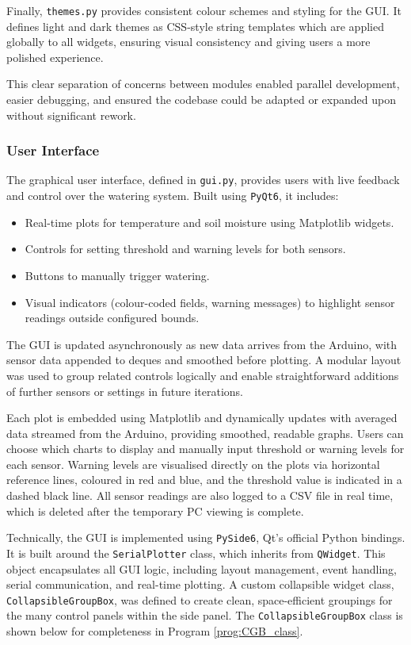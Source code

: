\documentclass[a4paper,11pt]{article}
\begin{document}
Finally, \texttt{themes.py} provides consistent colour schemes and styling for the GUI. 
It defines light and dark themes as CSS-style string templates 
which are applied globally to all widgets, 
ensuring visual consistency and giving users a more polished experience.

This clear separation of concerns between modules enabled parallel development, 
easier debugging, and ensured the codebase could be adapted 
or expanded upon without significant rework.

\subsubsection{User Interface}
\label{subsec:software_ui}

The graphical user interface, defined in \texttt{gui.py}, 
provides users with live feedback and control over the watering system. 
Built using \texttt{PyQt6}, it includes:

\begin{itemize}[nosep]
    \item Real-time plots for temperature and soil moisture using Matplotlib widgets.
    \item Controls for setting threshold and warning levels for both sensors.
    \item Buttons to manually trigger watering.
    \item Visual indicators (colour-coded fields, warning messages) 
    to highlight sensor readings outside configured bounds.
\end{itemize}

The GUI is updated asynchronously as new data arrives from the Arduino, 
with sensor data appended to deques and smoothed before plotting. 
A modular layout was used to group related controls logically and 
enable straightforward additions of further sensors or settings in future iterations.

Each plot is embedded using Matplotlib 
and dynamically updates with averaged data streamed from the Arduino, 
providing smoothed, readable graphs. 
Users can choose which charts to display
and manually input threshold or warning levels for each sensor.
Warning levels are visualised directly on the plots via horizontal reference lines,
coloured in red and blue, and the threshold value is indicated in a dashed black line. 
All sensor readings are also logged to a CSV file in real time,
which is deleted after the temporary PC viewing is complete.

Technically, the GUI is implemented using \texttt{PySide6}, 
Qt's official Python bindings. 
It is built around the \texttt{SerialPlotter} class, 
which inherits from \texttt{QWidget}. 
This object encapsulates all GUI logic, including layout management, 
event handling, serial communication, and real-time plotting. 
A custom collapsible widget class, \texttt{CollapsibleGroupBox}, 
was defined to create clean, space-efficient groupings for the many control panels 
within the side panel.
The \texttt{CollapsibleGroupBox} class is shown below for completeness 
in Program \ref{prog:CGB_class}.
\end{document}
